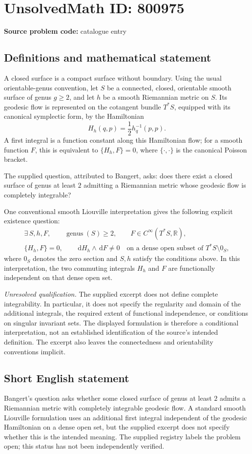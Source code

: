 \documentclass[11pt]{article}
\newcommand{\R}{\mathbb{R}}
\newcommand{\dd}{\,\mathrm{d}}
\begin{document}
\section*{UnsolvedMath ID: 800975}
\textbf{Source problem code:} catalogue entry
\subsection{Definitions and mathematical statement}
A closed surface is a compact surface without boundary. Using the usual orientable-genus convention, let \(S\) be a connected, closed, orientable smooth surface of genus \(g\geq 2\), and let \(h\) be a smooth Riemannian metric on \(S\). Its geodesic flow is represented on the cotangent bundle \(T^*S\), equipped with its canonical symplectic form, by the Hamiltonian
\[
H_h(q,p)=\frac12 h_q^{-1}(p,p).
\]
A first integral is a function constant along this Hamiltonian flow; for a smooth function \(F\), this is equivalent to \(\{H_h,F\}=0\), where \(\{\cdot,\cdot\}\) is the canonical Poisson bracket.

The supplied question, attributed to Bangert, asks: does there exist a closed surface of genus at least \(2\) admitting a Riemannian metric whose geodesic flow is completely integrable?

One conventional smooth Liouville interpretation gives the following explicit existence question:
\[
\begin{gathered}
\exists\, S,h,F,\qquad \operatorname{genus}(S)\geq 2,\qquad F\in C^\infty(T^*S,\R),\\
\{H_h,F\}=0,\qquad
\dd H_h\wedge\dd F\neq 0
\quad\text{on a dense open subset of }T^*S\setminus 0_S,
\end{gathered}
\]
where \(0_S\) denotes the zero section and \(S,h\) satisfy the conditions above. In this interpretation, the two commuting integrals \(H_h\) and \(F\) are functionally independent on that dense open set.

\emph{Unresolved qualification.} The supplied excerpt does not define complete integrability. In particular, it does not specify the regularity and domain of the additional integrals, the required extent of functional independence, or conditions on singular invariant sets. The displayed formulation is therefore a conditional interpretation, not an established identification of the source's intended definition. The excerpt also leaves the connectedness and orientability conventions implicit.
\subsection{Short English statement}
Bangert's question asks whether some closed surface of genus at least \(2\) admits a Riemannian metric with completely integrable geodesic flow. A standard smooth Liouville formulation uses an additional first integral independent of the geodesic Hamiltonian on a dense open set, but the supplied excerpt does not specify whether this is the intended meaning. The supplied registry labels the problem open; this status has not been independently verified.
\end{document}
